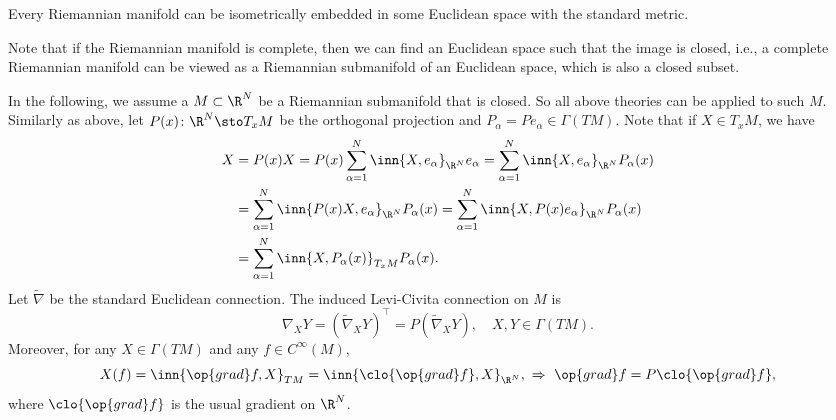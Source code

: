 \begin{thm}
    Every Riemannian manifold can be isometrically embedded in some Euclidean space with the standard metric. 
\end{thm}
\begin{rmk}
    Note that if the Riemannian manifold is complete, then we can find an Euclidean space such that the image is closed, i.e., a complete Riemannian manifold can be viewed as a Riemannian submanifold of an Euclidean space, which is also a closed subset.
\end{rmk}

In the following, we assume a $M \subset \R^N$ be a Riemannian submanifold that is closed. So all above theories can be applied to such $M$. Similarly as above, let $P(x) \colon \R^N \sto T_xM$ be the orthogonal projection and $P_\alpha = P e_\alpha \in \Gamma(TM)$. Note that if $X \in T_xM$, we have
\begin{align*}
    X &= P(x)X = P(x) \sum_{\alpha = 1}^N \inn{X,e_\alpha}_{\R^N}e_\alpha = \sum_{\alpha = 1}^N \inn{X,e_\alpha}_{\R^N}P_\alpha(x)\\
    &= \sum_{\alpha = 1}^N \inn{P(x)X,e_\alpha}_{\R^N}P_\alpha(x)= \sum_{\alpha = 1}^N \inn{X,P(x)e_\alpha}_{\R^N}P_\alpha(x)\\
    &= \sum_{\alpha = 1}^N \inn{X,P_\alpha(x)}_{T_xM}P_\alpha(x).
\end{align*}
Let $\widetilde{\nabla}$ be the standard Euclidean connection. The induced Levi-Civita connection on $M$ is
\begin{equation*}
    \nabla_XY = (\widetilde{\nabla}_XY)^\top = P(\widetilde{\nabla}_XY),\quad X,Y \in \Gamma(TM).
\end{equation*}
Moreover, for any $X \in \Gamma(TM)$ and any $f \in C^\infty(M)$,
\begin{equation*}
    X(f) = \inn{\op{grad}f,X}_{TM} = \inn{\clo{\op{grad}f},X}_{\R^N},~\Rightarrow~\op{grad}f = P\clo{\op{grad}f},
\end{equation*}
where $\clo{\op{grad}f}$ is the usual gradient on $\R^N$.


